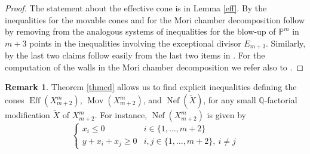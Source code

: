 \documentclass[a4paper,10pt]{amsart}
\theoremstyle{definition}
\newtheorem{Remark}[thm]{Remark}
\DeclareMathOperator{\Eff}{Eff}
\DeclareMathOperator{\Nef}{Nef}
\DeclareMathOperator{\Mov}{Mov}
\begin{document}
\begin{proof}
The statement about the effective cone is in Lemma \ref{eff}. By \cite[Theorem 1.2]{Ok16} the inequalities for the movable cones and for the Mori chamber decomposition follow by removing from the analogous systems of inequalities for the blow-up of $\mathbb{P}^m$ in $m+3$ points in \cite[Theorem 1.3]{AM16} the inequalities involving the exceptional divisor $E_{m+3}$. Similarly, by \cite[Theorem 1.2]{Ok16} the last two claims follow easily from the last two items in \cite[Theorem 1.3]{AM16}. For the computation of the walls in the Mori chamber decomposition we refer also to \cite{Mu05}.
\end{proof}

\begin{Remark}
Theorem \ref{thmcd} allows us to find explicit inequalities defining the cones $\Eff(X^{m}_{m+2})$, $\Mov(X^{m}_{m+2})$, and $\Nef(\widetilde{X})$, for any small $\mathbb{Q}$-factorial modification $\widetilde{X}$ of $X^{m}_{m+2}$. For instance, $\Nef(X^{m}_{m+2})$ is given by 
$$
\left\{
\begin{array}{ll}
x_i\leq 0 & i\in\{1,\dots,m+2\}\\ 
y+x_i+x_j\geq 0 & i,j\in\{1,\dots,m+2\}, \: i\neq j
\end{array}  
\right.
$$
\end{Remark}

\end{document}
